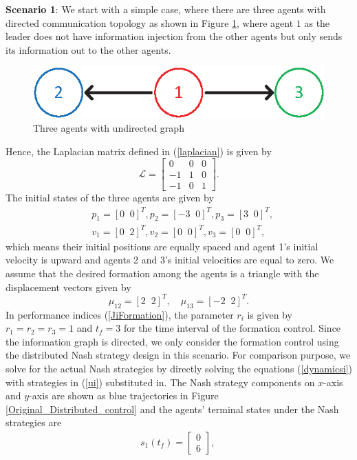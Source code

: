 \documentclass[12pt,draftcls,onecolumn]{IEEEtran}  %
\begin{document}
{\textbf{Scenario 1}: We start with a simple case, where there are three agents with directed communication topology as shown in Figure \ref{Formation3directed}, where agent $1$ as the leader does not have information injection from the other agents but only sends its information out to the other agents.
\begin{figure}[h!]
      \centering
      \includegraphics[scale=0.9]{Formation3directed.eps}
      \caption{Three agents with undirected graph}\label{Formation3directed}
\end{figure}
Hence, the Laplacian matrix defined in (\ref{laplacian}) is given by
\[\mathcal{L}=\begin{bmatrix}
0&0&0\\
-1&1&0\\
-1&0&1
\end{bmatrix}.\]
The initial states of the three agents are given by
{\begin{align*}
&p_1=[0\;\;0]^T, p_2=[-3\;\;0]^T,p_3=[3\;\;0]^T,\\
&v_1=[0\;\;2]^T,v_2=[0\;\;0]^T,v_3=[0\;\;0]^T,
\end{align*}}
which means their initial positions are equally spaced and agent 1's initial velocity is upward and agents 2 and 3's initial velocities are equal to zero. We assume that the desired formation among the agents is a triangle with the displacement vectors given by
\[\mu_{12}=[2\;\; 2]^T,\quad \mu_{13}=[-2\;\; 2]^T.\]
In performance indices (\ref{JiFormation}), the parameter $r_i$ is given by $r_1=r_2=r_3=1$ and $t_f=3$ for the time interval of the formation control. Since the information graph is directed, we only consider the formation control using the distributed Nash strategy design in this scenario. For comparison purpose, we solve for the actual Nash strategies by directly solving the equations (\ref{dynamicsi}) with strategies in (\ref{ui}) substituted in. The Nash strategy components on $x$-axis and $y$-axis are shown as blue trajectories in Figure \ref{Original_Distributed_control} and the agents' terminal states under the Nash strategies are
\begin{align*}
&s_1(t_f)=\begin{bmatrix}
0\\
6
\end{bmatrix},\quad

\end{align*}}
\end{document}
